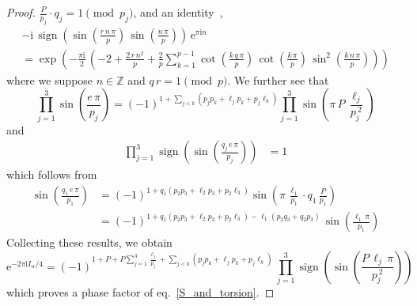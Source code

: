 \documentclass[12pt,reqno]{amsart}
\numberwithin{equation}{section}
\DeclareMathOperator{\sign}{sign}
\begin{document}
\begin{proof}
$\frac{P}{p_j} \cdot q_j =1 \pmod {p_j}$,
and
an identity~\cite{LCJeff92a,Rozan95a},
\begin{multline}
  -\mathrm{i} \,
  \sign
  \left(
    \sin \left(\frac{r \, n \, \pi}{p}\right) \,
    \sin \left(\frac{n \, \pi}{p}      \right)
  \right) \,
  \mathrm{e}^{\pi \mathrm{i} n}
  \\
  =
  \exp\left(
    -\frac{\pi \mathrm{i}}{2} \,
    \left(
      -2 + \frac{2 \, r \, n^2}{p}
      +
      \frac{2}{p}
      \sum_{k=1}^{p-1}
      \cot \left(\frac{k \, q \, \pi}{p}\right) \,
      \cot \left(\frac{k \, \pi}{p}\right) \,
      \sin^2 \left(\frac{k \, n \, \pi}{p}\right) 
    \right)
  \right)
\end{multline}
where we suppose  $n\in\mathbb{Z}$ and $q \, r =1 \pmod p$.
We further see that
\begin{equation*}
  \prod_{j=1}^3 
  \sin \left(
    \frac{ e \, \pi}{p_j}
  \right)
  =
  (-1)^{1 + 
    \sum_{j <k}
    \left(
      p_j p_k + \ell_j p_k + p_j \ell_k
    \right)
  }
  \prod_{j=1}^3
  \sin\left(
    \pi \, P \, \frac{\ell_j}{p_j^{~2}}
  \right)
\end{equation*}
and
\begin{align*}
  \prod_{j=1}^3 
  \sign \left(
    \sin \left(
      \frac{q_j \, e \, \pi}{p_j}
    \right)
  \right)
  & =
  1
\end{align*}
which follows from
\begin{align*}
  \sin \left( \frac{ q_1 \, e \, \pi}{p_1} \right)
  & =
  (-1)^{1 + q_1 ( p_2 p_3 + \ell_2 p_3 + p_2\ell_3)} 
  \sin\left(
    \pi \, \frac{\ell_1}{p_1}
    \cdot  q_1  \, \frac{P}{p_1} 
  \right)
  \\
  & =
  (-1)^{1+  q_1 ( p_2 p_3 + \ell_2 p_3 + p_2\ell_3) 
    -\ell_1 (p_2 q_3 + q_2 p_3)} \,
  \sin
  \left(
    \frac{\ell_1 \, \pi}{p_1}
  \right)
\end{align*}
Collecting these results, we obtain
\begin{equation*}
  \mathrm{e}^{-2 \pi \mathrm{i} I_\alpha/4}
  =
  (-1)^{
    1+ P + P \sum_{j=1}^3 \frac{\ell_j}{p_j}
    +
    \sum_{j<k}
    \left(
      p_j p_k + \ell_j p_k + p_j \ell_k
    \right)
  } \,
  \prod_{j=1}^3
  \sign
  \left(
    \sin
    \left(
      \frac{ P \, \ell_j \, \pi}{p_j^{~2}}
    \right)
  \right)
\end{equation*}
which proves a phase factor of eq.~\eqref{S_and_torsion}.
\end{proof}
\end{document}
